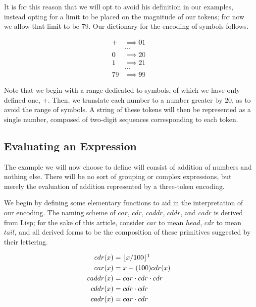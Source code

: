 \documentclass{article}
\DeclarePairedDelimiter{\floor}{\lfloor}{\rfloor}
\begin{document}
It is for this reason that we will opt to avoid his definition in our examples, instead opting for 
a limit to be placed on the magnitude of our tokens; for now we allow that limit to be $79$. Our 
dictionary for the encoding of symbols follows.

\begin{align*}
    + &\implies 01
\\  &\dots
\\  0 &\implies 20
\\  1 &\implies 21
\\  &\dots
\\  79 &\implies 99
\end{align*}

Note that we begin with a range dedicated to symbols, of which we have only defined one, $+$. Then, we
translate each number to a number greater by $20$, as to avoid the range of symbols. A string of these
tokens will then be represented as a single number, composed of two-digit sequences corresponding to
each token.

\subsection{Evaluating an Expression}
The example we will now choose to define will consist of addition of numbers and nothing else. There
will be no sort of grouping or complex expressions, but merely the evaluation of addition represented by
a three-token encoding. 

We begin by defining some elementary functions to aid in the interpretation of our encoding. The naming 
scheme of $car$, $cdr$, $caddr$, $cddr$, and $cadr$ is derived from Lisp; for the sake of this article, 
consider $car$ to mean $head$, $cdr$ to mean $tail$, and all derived forms to be the composition of 
these primitives suggested by their lettering.

\begin{align*}
    cdr(x) &= \floor{x / 100}\footnotemark
\\  car(x) &= x - (100)cdr(x)
\\  caddr(x) &= car \cdot cdr \cdot cdr
\\  cddr(x) &= cdr \cdot cdr
\\  cadr(x) &= car \cdot cdr
\end{align*}
\end{document}
